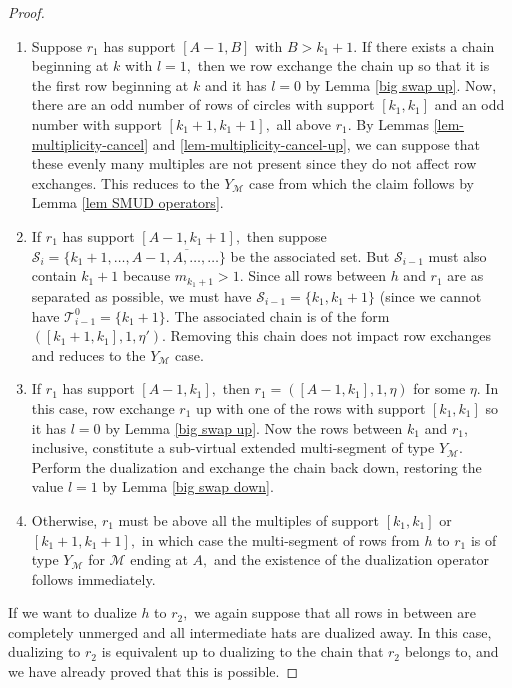 \documentclass[11pt,letterpaper]{amsart}
\numberwithin{equation}{section}
\begin{document}
\begin{proof}
    \begin{enumerate}
        \item Suppose  $r_1$ has support $[A - 1, B]$ with $B > k_1 + 1.$ If there exists a chain beginning at $k$ with $l = 1,$ then we row exchange the chain up so that it is the first row beginning at $k$ and it has $l = 0$ by Lemma \ref{big swap up}. Now, there are an odd number of rows of circles with support $[k_1, k_1]$ and an odd number with support $[k_1 + 1, k_1 + 1],$ all above $r_1.$ By Lemmas \ref{lem-multiplicity-cancel} and \ref{lem-multiplicity-cancel-up}, we can suppose that these evenly many multiples are not present since they do not affect row exchanges. This reduces to the $Y_\mathcal{M}$ case from which the claim follows by Lemma \ref{lem SMUD operators}.
        \item If $r_1$ has support $[A - 1, k_1 + 1],$ then suppose $\mathcal{S}_i = \{k_1 + 1, \dots, A - 1, \overline{A, \dots }, \dots\}$ be the associated set. But $\mathcal{S}_{i - 1}$ must also contain $k_1 + 1$ because $m_{k_1 + 1} > 1.$ Since all rows between $h$ and $r_1$ are as separated as possible, we must have $\mathcal{S}_{i - 1} = \{k_1, k_1 + 1\}$ (since we cannot have $\mathcal{T}_{i - 1}^0 = \{k_1 + 1\}.$ The associated chain is of the form $([k_1 + 1, k_1], 1, \eta').$ Removing this chain does not impact row exchanges and reduces to the $Y_\mathcal{M}$ case.
        \item If $r_1$ has support $[A - 1, k_1],$ then $r_1 = ([A - 1, k_1], 1, \eta)$ for some $\eta.$ In this case, row exchange $r_1$ up with one of the rows with support $[k_1, k_1]$ so it has $l = 0$ by Lemma \ref{big swap up}. Now the rows between $k_1$ and $r_1$, inclusive, constitute a sub-virtual extended multi-segment of type $Y_\mathcal{M}$. Perform the dualization and exchange the chain back down, restoring the value $l = 1$ by Lemma \ref{big swap down}.
        \item Otherwise, $r_1$ must be above all the multiples of support $[k_1, k_1]$ or $[k_1 + 1, k_1 + 1],$ in which case the multi-segment of rows from $h$ to $r_1$ is of type $Y_{\mathcal{M}}$ for $\mathcal{M}$ ending at $A,$ and the existence of the dualization operator follows immediately.
    \end{enumerate}

    If we want to dualize $h$ to $r_2,$ we again suppose that all rows in between are completely unmerged and all intermediate hats are dualized away. In this case, dualizing to $r_2$ is equivalent up to dualizing to the chain that $r_2$ belongs to, and we have already proved that this is possible.
\end{proof}
\end{document}
